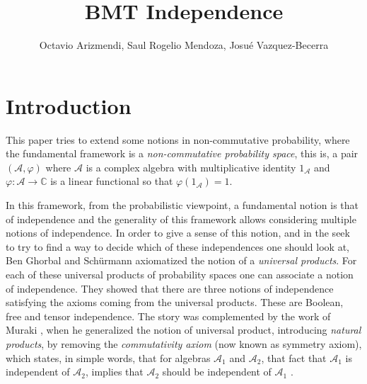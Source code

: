 \documentclass[a4paper,12pt]{extarticle}
\title{ BMT Independence }
\date{}
\author{Octavio Arizmendi, Saul Rogelio Mendoza, Josué Vazquez-Becerra}
\theoremstyle{definition}
\theoremstyle{remark}
\def\AA{\mathcal{A}}
\begin{document}
\maketitle


\tableofcontents

\section{Introduction}

This paper tries to extend some notions in non-commutative probability, where the fundamental framework is a  \emph{non-commutative probability space}, this is, a pair $(\AA,\varphi)$ where $\AA$ is a complex algebra with multiplicative identity $1_\AA$ and $\varphi:\AA\to\mathbb{C}$ is a linear functional so that $\varphi(1_\AA)=1$. 

In this framework, from the probabilistic viewpoint, a fundamental notion is that of independence and the generality of this framework allows considering multiple notions of independence. In order to give a sense of this notion, and in the seek to try to find a way to decide which of these independences one should look at, Ben Ghorbal and Schürmann \cite{GC2002} axiomatized the notion of a \textit{universal products}. For each of these universal products of probability spaces one can associate a notion of independence. They showed that there are three notions of independence satisfying the axioms coming from the universal products. These are Boolean, free and tensor independence. The story was complemented by the work of Muraki \cite{Muraki2003}, when he  generalized the notion of universal product, introducing \emph{natural products}, by removing the \emph{commutativity axiom} (now known as symmetry axiom), which states, in simple words, that for algebras $\mathcal{A}_1$ and  $\mathcal{A}_2$, that fact that $\mathcal{A}_1$ is independent of $\mathcal{A}_2$, implies that $\mathcal{A}_2$ should be independent of $\mathcal{A}_1$ . 
\end{document}
